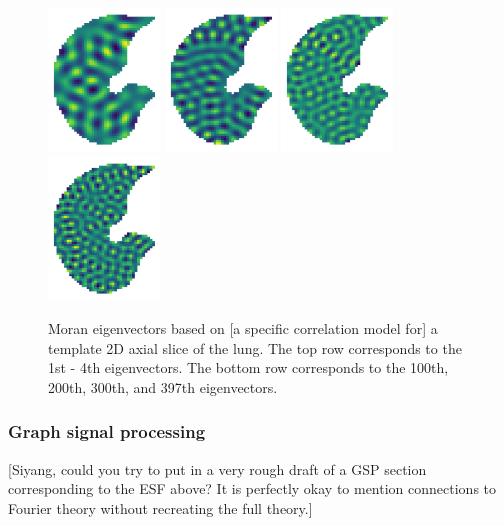 \documentclass[12pt]{article}
\begin{document}
\begin{figure}
\includegraphics[height=1.5in]{EV100}
\includegraphics[height=1.5in]{EV200}
\includegraphics[height=1.5in]{EV300}
\includegraphics[height=1.5in]{EV397}  
\caption{Moran eigenvectors based on [a specific correlation model for] a template 2D axial slice of the lung. The top row corresponds to the 1st - 4th eigenvectors. The bottom row corresponds to the 100th, 200th, 300th, and 397th eigenvectors. }
\label{fig:eigenvectors}
\end{figure}

\subsubsection{Graph signal processing}

[Siyang, could you try to put in a very rough draft of a GSP section corresponding to the ESF above? It is perfectly okay to mention connections to Fourier theory without recreating the full theory.]
\end{document}
